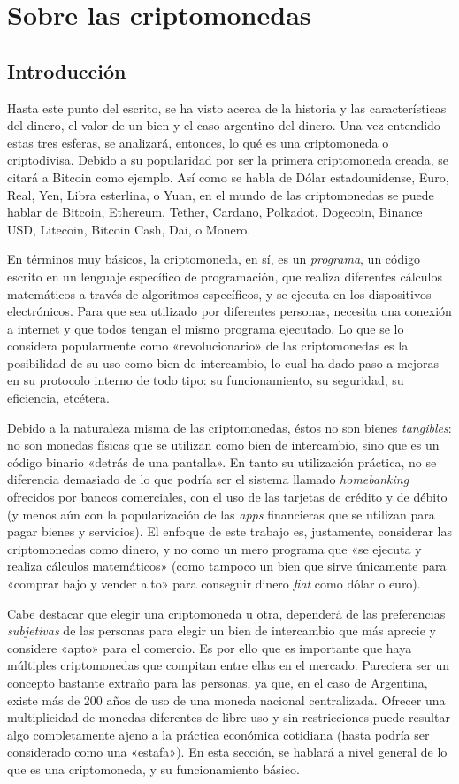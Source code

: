 \documentclass[12pt,a4paper,twoside]{book}
\begin{document}
\part{Sobre las criptomonedas}
\chapter{Introducción}
Hasta este punto del escrito, se ha visto acerca de la historia y las características del dinero, el valor de un bien y el caso argentino del dinero. Una vez entendido estas tres esferas, se analizará, entonces, lo qué es una criptomoneda o criptodivisa. Debido a su popularidad por ser la primera criptomoneda creada, se citará a Bitcoin como ejemplo. Así como se habla de Dólar estadounidense, Euro, Real, Yen, Libra esterlina, o Yuan, en el mundo de las criptomonedas se puede hablar de Bitcoin, Ethereum, Tether, Cardano, Polkadot, Dogecoin, Binance USD, Litecoin, Bitcoin Cash, Dai, o Monero.

En términos muy básicos, la criptomoneda, en sí, es un \textit{programa}, un código escrito en un lenguaje específico de programación, que realiza diferentes cálculos matemáticos a través de algoritmos específicos, y se ejecuta en los dispositivos electrónicos. Para que sea utilizado por diferentes personas, necesita una conexión a internet y que todos tengan el mismo programa ejecutado. Lo que se lo considera popularmente como «revolucionario» de las criptomonedas es la posibilidad de su uso como bien de intercambio, lo cual ha dado paso a mejoras en su protocolo interno de todo tipo: su funcionamiento, su seguridad, su eficiencia, etcétera.

Debido a la naturaleza misma de las criptomonedas, éstos no son bienes \textit{tangibles}: no son monedas físicas que se utilizan como bien de intercambio, sino que es un código binario «detrás de una pantalla». En tanto su utilización práctica, no se diferencia demasiado de lo que podría ser el sistema llamado \textit{homebanking} ofrecidos por bancos comerciales, con el uso de las tarjetas de crédito y de débito (y menos aún con la popularización de las \textit{apps} financieras que se utilizan para pagar bienes y servicios). El enfoque de este trabajo es, justamente, considerar las criptomonedas como dinero, y no como un mero programa que «se ejecuta y realiza cálculos matemáticos» (como tampoco un bien que sirve únicamente para «comprar bajo y vender alto» para conseguir dinero \textit{fiat} como dólar o euro).

Cabe destacar que elegir una criptomoneda u otra, dependerá de las preferencias \textit{subjetivas} de las personas para elegir un bien de intercambio que más aprecie y considere «apto» para el comercio. Es por ello que es importante que haya múltiples criptomonedas que compitan entre ellas en el mercado. Pareciera ser un concepto bastante extraño para las personas, ya que, en el caso de Argentina, existe más de 200 años de uso de una moneda nacional centralizada. Ofrecer una multiplicidad de monedas diferentes de libre uso y sin restricciones puede resultar algo completamente ajeno a la práctica económica cotidiana (hasta podría ser considerado como una «estafa»). En esta sección, se hablará a nivel general de lo que es una criptomoneda, y su funcionamiento básico.
\end{document}
